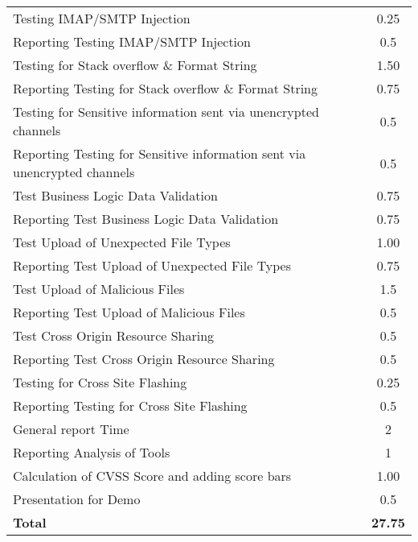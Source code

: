 \begin{table}[H]
\begin{tabular*}{\textwidth}{@{\extracolsep{\fill}} l c@{\extracolsep{0pt}} }
Testing IMAP/SMTP Injection                 & 0.25 \\
Reporting Testing IMAP/SMTP Injection       & 0.5 \\
Testing for Stack overflow \& Format String & 1.50 \\
Reporting Testing for Stack overflow \& Format String & 0.75 \\
Testing for Sensitive information sent via unencrypted channels & 0.5 \\
Reporting Testing for Sensitive information sent via unencrypted channels & 0.5 \\
Test Business Logic Data Validation         & 0.75 \\
Reporting Test Business Logic Data Validation & 0.75 \\
Test Upload of Unexpected File Types        & 1.00 \\
Reporting Test Upload of Unexpected File Types & 0.75 \\
Test Upload of Malicious Files              & 1.5 \\
Reporting Test Upload of Malicious Files    & 0.5 \\
Test Cross Origin Resource Sharing          & 0.5 \\
Reporting Test Cross Origin Resource Sharing & 0.5 \\
Testing for Cross Site Flashing             & 0.25 \\
Reporting Testing for Cross Site Flashing   & 0.5 \\
General report Time							& 2 \\
Reporting Analysis of Tools                 & 1 \\
Calculation of CVSS Score and adding score bars	& 1.00 \\
Presentation for Demo						& 0.5 \\ \hline\hline
\textbf{Total}								& \textbf{27.75}
\end{tabular*}
\end{table}


